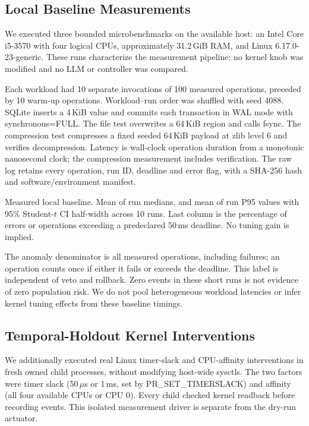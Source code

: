 \subsection{Local Baseline Measurements}
We executed three bounded microbenchmarks on the available host: an Intel Core i5-3570 with four logical CPUs, approximately 31.2\,GiB RAM, and Linux 6.17.0-23-generic. These runs characterize the measurement pipeline: no kernel knob was modified and no LLM or controller was compared.

Each workload had 10 separate invocations of 100 measured operations, preceded by 10 warm-up operations. Workload--run order was shuffled with seed 4088. SQLite inserts a 4\,KiB value and commits each transaction in WAL mode with synchronous=FULL. The file test overwrites a 64\,KiB region and calls fsync. The compression test compresses a fixed seeded 64\,KiB payload at zlib level 6 and verifies decompression. Latency is wall-clock operation duration from a monotonic nanosecond clock; the compression measurement includes verification. The raw log retains every operation, run ID, deadline and error flag, with a SHA-256 hash and software/environment manifest.

\begin{table}[t]
\centering
\caption{Measured local baseline. Mean of run medians, and mean of run P95 values with 95\% Student-$t$ CI half-width across 10 runs. Last column is the percentage of errors or operations exceeding a predeclared 50\,ms deadline. No tuning gain is implied.}
\label{tab:local}
\small
\begin{adjustbox}{max width=\columnwidth}

\end{adjustbox}
\end{table}

The anomaly denominator is all measured operations, including failures; an operation counts once if either it fails or exceeds the deadline. This label is independent of veto and rollback. Zero events in these short runs is not evidence of zero population risk. We do not pool heterogeneous workload latencies or infer kernel tuning effects from these baseline timings.

\subsection{Temporal-Holdout Kernel Interventions}
We additionally executed real Linux timer-slack and CPU-affinity interventions in fresh owned child processes, without modifying host-wide sysctls. The two factors were timer slack (50\,$\mu$s or 1\,ms, set by PR\_SET\_TIMERSLACK) and affinity (all four available CPUs or CPU 0). Every child checked kernel readback before recording events. This isolated measurement driver is separate from the dry-run \sysname actuator.

